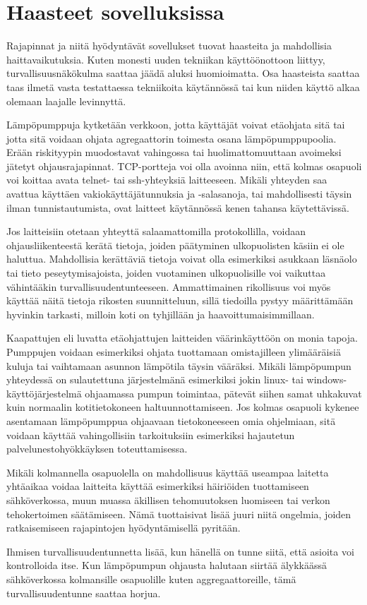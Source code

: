 \section{Haasteet sovelluksissa}

  Rajapinnat ja niitä hyödyntävät sovellukset tuovat haasteita ja mahdollisia haittavaikutuksia. Kuten monesti uuden tekniikan käyttöönottoon liittyy, turvallisuusnäkökulma saattaa jäädä aluksi huomioimatta. Osa haasteista saattaa taas ilmetä vasta testattaessa tekniikoita käytännössä tai kun niiden käyttö alkaa olemaan laajalle levinnyttä.

  Lämpöpumppuja kytketään verkkoon, jotta käyttäjät voivat etäohjata sitä tai jotta sitä voidaan ohjata agregaattorin toimesta osana lämpöpumppupoolia. Erään riskityypin muodostavat vahingossa tai huolimattomuuttaan avoimeksi jätetyt ohjausrajapinnat. TCP-portteja voi olla avoinna niin, että kolmas osapuoli voi koittaa avata telnet- tai ssh-yhteyksiä laitteeseen. Mikäli yhteyden saa avattua käyttäen vakiokäyttäjätunnuksia ja -salasanoja, tai mahdollisesti täysin ilman tunnistautumista, ovat laitteet käytännössä kenen tahansa käytettävissä.

  Jos laitteisiin otetaan yhteyttä salaamattomilla protokollilla, voidaan ohjausliikenteestä kerätä tietoja, joiden päätyminen ulkopuolisten käsiin ei ole haluttua. Mahdollisia kerättäviä tietoja voivat olla esimerkiksi asukkaan läsnäolo tai tieto peseytymisajoista, joiden vuotaminen ulkopuolisille voi vaikuttaa vähintääkin turvallisuudentunteeseen. Ammattimainen rikollisuus voi myös käyttää näitä tietoja rikosten suunnitteluun, sillä tiedoilla pystyy määrittämään hyvinkin tarkasti, milloin koti on tyhjillään ja haavoittumaisimmillaan.

  Kaapattujen eli luvatta etäohjattujen laitteiden väärinkäyttöön on monia tapoja. Pumppujen voidaan esimerkiksi ohjata tuottamaan omistajilleen ylimääräisiä kuluja tai vaihtamaan asunnon lämpötila täysin vääräksi. Mikäli lämpöpumpun yhteydessä on sulautettuna järjestelmänä esimerkiksi jokin linux- tai windows-käyttöjärjestelmä ohjaamassa pumpun toimintaa, pätevät siihen samat uhkakuvat kuin normaalin kotitietokoneen haltuunnottamiseen. Jos kolmas osapuoli kykenee asentamaan lämpöpumppua ohjaavaan tietokoneeseen omia ohjelmiaan, sitä voidaan käyttää vahingollisiin tarkoituksiin esimerkiksi hajautetun palvelunestohyökkäyksen toteuttamisessa.

  Mikäli kolmannella osapuolella on mahdollisuus käyttää useampaa laitetta yhtäaikaa voidaa laitteita käyttää esimerkiksi häiriöiden tuottamiseen sähköverkossa, muun muassa äkillisen tehomuutoksen luomiseen tai verkon tehokertoimen säätämiseen. Nämä tuottaisivat lisää juuri niitä ongelmia, joiden ratkaisemiseen rajapintojen hyödyntämisellä pyritään.

  Ihmisen turvallisuudentunnetta lisää, kun hänellä on tunne siitä, että asioita voi kontrolloida itse. Kun lämpöpumpun ohjausta halutaan siirtää älykkäässä sähköverkossa kolmansille osapuolille kuten aggregaattoreille, tämä turvallisuudentunne saattaa horjua.
